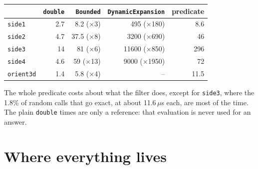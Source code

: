 \documentclass[11pt,a4paper]{article}
\newcommand{\code}[1]{\texttt{#1}}
\theoremstyle{definition}
\theoremstyle{remark}
\begin{document}
\begin{center}
\begin{tabular}{@{}lrrrr@{}}
  \toprule
  & \code{double} & \code{Bounded} & \code{DynamicExpansion} & predicate \\
  \midrule
  \code{side1}    & 2.7 & 8.2 ($\times$3)   & 495 ($\times$180)    & 8.6 \\
  \code{side2}    & 4.7 & 37.5 ($\times$8)  & 3200 ($\times$690)   & 46 \\
  \code{side3}    & 14  & 81 ($\times$6)    & 11600 ($\times$850)  & 296 \\
  \code{side4}    & 4.6 & 59 ($\times$13)   & 9000 ($\times$1950)  & 72 \\
  \code{orient3d} & 1.4 & 5.8 ($\times$4)   & --                   & 11.5 \\
  \bottomrule
\end{tabular}
\end{center}

\noindent The whole predicate costs about what the filter does, except for \code{side3}, where the
1.8\% of random calls that go exact, at about 11.6\,$\mu$s each, are most of the time. The plain
\code{double} times are only a reference: that evaluation is never used for an answer.

\section{Where everything lives}\label{sec:where}
\end{document}
